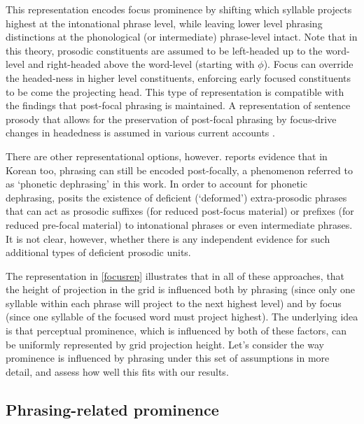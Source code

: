 \documentclass[preprint,review,12pt,authoryear,times]{elsarticle}
\begin{document}
This representation encodes focus prominence by shifting which syllable projects highest at the intonational phrase level, while leaving lower level phrasing distinctions at the phonological (or intermediate) phrase-level intact. Note that in this theory, prosodic constituents are assumed to be left-headed up to the word-level and right-headed above the word-level (starting with $\phi$). Focus can override the headed-ness in higher level constituents, enforcing early focused constituents to be come the projecting head. This type of representation is compatible with the findings that post-focal phrasing is maintained. A representation of sentence prosody that allows for the preservation of post-focal phrasing by focus-drive changes in headedness is assumed in various current accounts \citep[][i.a.]{truck95,burin10,fery12a,fery13,kugle17}.

There are other representational options, however. \citet{jun11} reports evidence that in Korean too, phrasing can still be encoded post-focally, a phenomenon referred to as `phonetic dephrasing' in this work. In order to account for phonetic dephrasing, \citet{jun11} posits the existence of deficient (`deformed') extra-prosodic phrases that can act as prosodic suffixes (for reduced post-focus material) or prefixes (for reduced pre-focal material) to intonational phrases or even intermediate phrases. It is not clear, however, whether there is any independent evidence for such additional types of deficient prosodic units. 

The representation in \ref{focusrep} illustrates that in all of these approaches, that the height of projection in the grid  is influenced both by phrasing (since only one syllable within each phrase will project to the next highest level) and by focus  (since one syllable of the focused word must project highest). The underlying idea is that perceptual prominence, which is influenced by both of these factors, can be uniformly represented by grid projection height. Let's consider the way prominence is influenced by phrasing under this set of assumptions in more detail, and assess how well this fits with our results.   


\subsection{Phrasing-related prominence}
\end{document}
